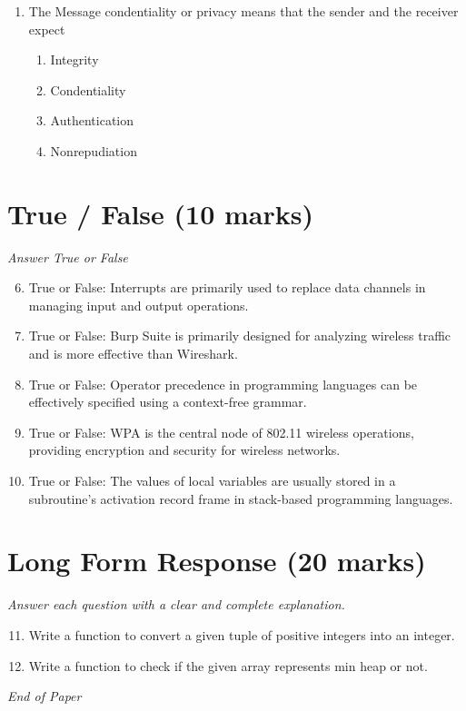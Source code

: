 \documentclass[12pt]{article}
\begin{document}
\begin{enumerate}[label=\arabic*.]
\begin{enumerate}[label=(\alph*)]
    \item Morris Worm
    \item Code Red
\end{enumerate}
\item The Message condentiality or privacy means that the sender and the receiver expect
\begin{enumerate}[label=(\alph*)]
    \item Integrity
    \item Condentiality
    \item Authentication
    \item Nonrepudiation
\end{enumerate}
\end{enumerate}

\section*{True / False (10 marks)}
\textit{Answer True or False}
\begin{enumerate}[label=\arabic*.]
\setcounter{enumi}{5}
\item True or False: Interrupts are primarily used to replace data channels in managing input and output operations.
\item True or False: Burp Suite is primarily designed for analyzing wireless traffic and is more effective than Wireshark.
\item True or False: Operator precedence in programming languages can be effectively specified using a context-free grammar.
\item True or False: WPA is the central node of 802.11 wireless operations, providing encryption and security for wireless networks.
\item True or False: The values of local variables are usually stored in a subroutine's activation record frame in stack-based programming languages.
\end{enumerate}

\section*{Long Form Response (20 marks)}
\textit{Answer each question with a clear and complete explanation.}
\begin{enumerate}[label=\arabic*.]
\setcounter{enumi}{10}
\item Write a function to convert a given tuple of positive integers into an integer.
\item Write a function to check if the given array represents min heap or not.
\end{enumerate}

\vfill
\noindent\textit{End of Paper}
\end{document}
